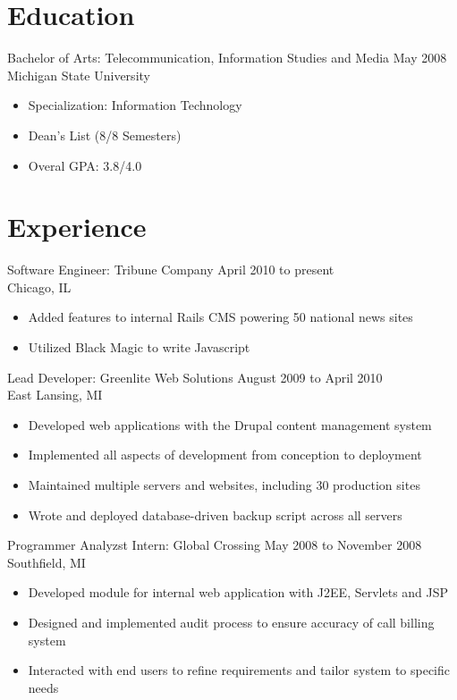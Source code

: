 \documentclass[]{res}
\begin{document}


\begin{resume}
\section{Education}
Bachelor of Arts: Telecommunication, Information Studies and Media \hfill May 2008\\
Michigan State University
\begin{itemize}
\item Specialization: Information Technology
\item Dean's List (8/8 Semesters)
\item Overal GPA: 3.8/4.0
\end{itemize}


\section{Experience}
Software Engineer: Tribune Company \hfill April 2010 to present\\
Chicago, IL
\begin{itemize}
\item Added features to internal Rails CMS powering 50 national news sites
\item Utilized Black Magic to write Javascript
\end{itemize}

Lead Developer: Greenlite Web Solutions \hfill August 2009 to April 2010\\
East Lansing, MI
\begin{itemize}
\item Developed web applications with the Drupal content management system
\item Implemented all aspects of development from conception to deployment
\item Maintained multiple servers and websites, including 30 production sites
\item Wrote and deployed database-driven backup script across all servers
\end{itemize}

Programmer Analyzst Intern: Global Crossing \hfill May 2008 to November 2008\\
Southfield, MI
\begin{itemize}
\item Developed module for internal web application with J2EE, Servlets and JSP
\item Designed and implemented audit process to ensure accuracy of call billing system
\item Interacted with end users to refine requirements and tailor system to specific needs
\end{itemize}


\end{resume}
\end{document}
